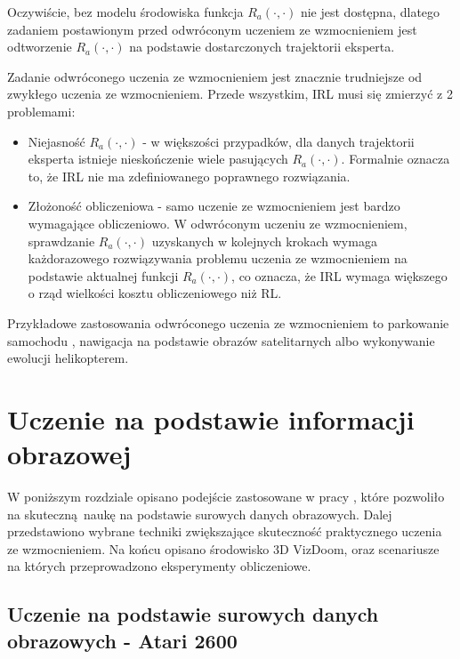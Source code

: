 \documentclass[polish,master,a4paper,oneside]{ppfcmthesis}
\begin{document}
Oczywiście, bez modelu środowiska funkcja $R_a(\cdot,\cdot)$ nie jest dostępna, dlatego zadaniem postawionym przed odwróconym uczeniem ze wzmocnieniem jest odtworzenie $R_a(\cdot,\cdot)$ na podstawie dostarczonych trajektorii eksperta.

Zadanie odwróconego uczenia ze wzmocnieniem jest znacznie trudniejsze od zwykłego uczenia ze wzmocnieniem. Przede wszystkim, IRL musi się zmierzyć z 2 problemami:

\begin{itemize}
\item Niejasność $R_a(\cdot,\cdot)$ - w większości przypadków, dla danych trajektorii eksperta istnieje nieskończenie wiele pasujących $R_a(\cdot,\cdot)$. Formalnie oznacza to, że IRL nie ma zdefiniowanego poprawnego rozwiązania.
\item Złożoność obliczeniowa - samo uczenie ze wzmocnieniem jest bardzo wymagające obliczeniowo. W odwróconym uczeniu ze wzmocnieniem, sprawdzanie $R_a(\cdot,\cdot)$ uzyskanych w kolejnych krokach wymaga każdorazowego rozwiązywania problemu uczenia ze wzmocnieniem na podstawie aktualnej funkcji $R_a(\cdot,\cdot)$, co oznacza, że IRL wymaga większego o rząd wielkości kosztu obliczeniowego niż RL.
\end{itemize}

Przykładowe zastosowania odwróconego uczenia ze wzmocnieniem to parkowanie samochodu \cite{DBLP:conf/iros/AbbeelDNT08}, nawigacja na podstawie obrazów satelitarnych \cite{Ratliff:2006:MMP:1143844.1143936} albo wykonywanie ewolucji helikopterem\cite{DBLP:journals/cacm/CoatesAN09}.


  \chapter{Uczenie na podstawie informacji obrazowej}

W poniższym rozdziale opisano podejście zastosowane w pracy \cite{mnih2015human}, które pozwoliło na skuteczną naukę na podstawie surowych danych obrazowych. Dalej przedstawiono wybrane techniki zwiększające skuteczność praktycznego uczenia ze wzmocnieniem. Na końcu opisano środowisko 3D VizDoom, oraz scenariusze na których przeprowadzono eksperymenty obliczeniowe.
\section{Uczenie na podstawie surowych danych obrazowych - Atari 2600}
\end{document}
